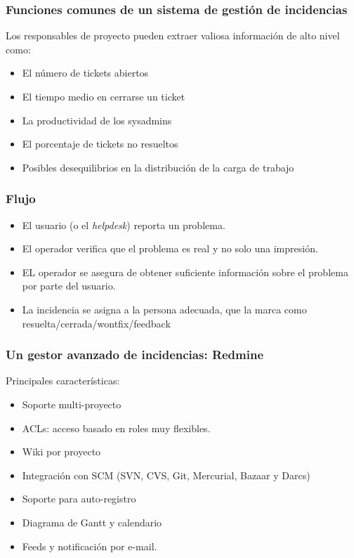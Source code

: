 \documentclass{beamer}
\begin{document}
\begin{frame}
\frametitle{Funciones comunes de un sistema de gestión de incidencias}

Los responsables de proyecto pueden extraer valiosa información de alto nivel como:

\begin{itemize}
\item El número de tickets abiertos 
\item El tiempo medio en cerrarse un ticket
\item La productividad de los sysadmins
\item El porcentaje de tickets no resueltos
\item Posibles desequilibrios en la distribución de la carga de trabajo

\end{itemize}
\end{frame}



\begin{frame}
\frametitle{Flujo}

\begin{itemize}
\item El usuario (o el \textit{helpdesk}) reporta un problema.
\item El operador verifica que el problema es real y no solo una impresión.
\item EL operador se asegura de obtener suficiente información sobre el problema por parte del usuario.
\item La incidencia se asigna a la persona adecuada, que la marca como resuelta/cerrada/wontfix/feedback

\end{itemize}
\end{frame}


\begin{frame}
\frametitle{Un gestor avanzado de incidencias: Redmine}

Principales características:
\begin{itemize}
\item Soporte multi-proyecto
\item ACLs: acceso basado en roles muy flexibles. 
\item Wiki por proyecto
\item Integración con SCM (SVN, CVS, Git, Mercurial, Bazaar y Darcs)
\item Soporte para auto-registro
\item Diagrama de Gantt y calendario
\item Feeds y notificación por e-mail.
\end{itemize}
\end{frame}
\end{document}
